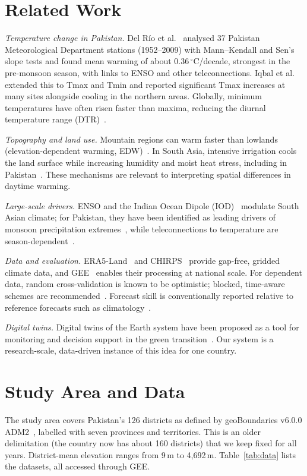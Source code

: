 \documentclass[conference]{IEEEtran}
\newcommand{\degC}{\ensuremath{^\circ}C}
\begin{document}
\section{Related Work}
\textit{Temperature change in Pakistan.} Del R\'{i}o et al.~\cite{delrio2013} analysed 37 Pakistan Meteorological Department stations (1952--2009) with Mann--Kendall and Sen's slope tests and found mean warming of about 0.36\,\degC/decade, strongest in the pre-monsoon season, with links to ENSO and other teleconnections. Iqbal et al.~\cite{iqbal2016} extended this to Tmax and Tmin and reported significant Tmax increases at many sites alongside cooling in the northern areas. Globally, minimum temperatures have often risen faster than maxima, reducing the diurnal temperature range (DTR)~\cite{vose2005}.

\textit{Topography and land use.} Mountain regions can warm faster than lowlands (elevation-dependent warming, EDW)~\cite{pepin2015}. In South Asia, intensive irrigation cools the land surface while increasing humidity and moist heat stress, including in Pakistan~\cite{mishra2020}. These mechanisms are relevant to interpreting spatial differences in daytime warming.

\textit{Large-scale drivers.} ENSO and the Indian Ocean Dipole (IOD)~\cite{saji1999} modulate South Asian climate; for Pakistan, they have been identified as leading drivers of monsoon precipitation extremes~\cite{hussain2024}, while teleconnections to temperature are season-dependent~\cite{delrio2013}.

\textit{Data and evaluation.} ERA5-Land~\cite{munoz2021} and CHIRPS~\cite{funk2015,funk2026} provide gap-free, gridded climate data, and GEE~\cite{gorelick2017} enables their processing at national scale. For dependent data, random cross-validation is known to be optimistic; blocked, time-aware schemes are recommended~\cite{roberts2017,bergmeir2012}. Forecast skill is conventionally reported relative to reference forecasts such as climatology~\cite{murphy1988}.

\textit{Digital twins.} Digital twins of the Earth system have been proposed as a tool for monitoring and decision support in the green transition~\cite{bauer2021}. Our system is a research-scale, data-driven instance of this idea for one country.

\section{Study Area and Data}
The study area covers Pakistan's 126 districts as defined by geoBoundaries v6.0.0 ADM2~\cite{runfola2020}, labelled with seven provinces and territories. This is an older delimitation (the country now has about 160 districts) that we keep fixed for all years. District-mean elevation ranges from 9\,m to 4{,}692\,m. Table~\ref{tab:data} lists the datasets, all accessed through GEE.
\end{document}
